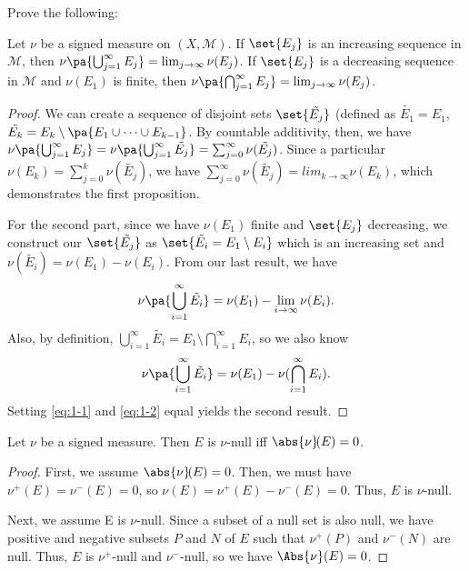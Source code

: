 \documentclass[12pt,letterpaper,twoside]{hmcpset}
\begin{document}
Prove the following:

\begin{problem}[1]
 Let $\nu$ be a signed measure on $(X,\mathcal{M})$. If $\set{E_j}$ is an increasing sequence in $\mathcal{M}$, then $\nu\pa{\bigcup^\infty_{j=1} E_j} = \lim_{j\to\infty} \nu(E_j)$.  If $\set{E_j}$ is a decreasing sequence in $\mathcal{M}$ and $\nu(E_1)$ is finite, then  $\nu\pa{\bigcap^\infty_{j=1} E_j} = \lim_{j\to\infty} \nu(E_j)$. 
\end{problem}

\begin{solution}
 \begin{proof}
  We can create a sequence of disjoint sets $\set{\tilde{E_j}}$ (defined as $\tilde{E_1} = E_1$, $\tilde{E_k} = E_k \setminus \pa{E_1 \cup \dotsb \cup E_{k-1}}$. By countable additivity, then, we have $\nu\pa{\bigcup^\infty_{j=1} E_j} = \nu\pa{\bigcup^\infty_{j=1} \tilde{E_j}} = \sum^\infty_{j=0} \nu(\tilde{E_j})$. Since a particular $\nu(E_k) = \sum^k_{j=0} \nu(\tilde{E_j})$, we have $\sum^\infty_{j=0} \nu(\tilde{E_j}) = lim_{k\to\infty} \nu(E_k)$, which demonstrates the first proposition.
  
  For the second part, since we have $\nu(E_1)$ finite and $\set{E_j}$ decreasing, we construct our $\set{\tilde{E_j}}$ as $\set{\tilde{E_i} = E_1 \setminus E_i}$ which is an increasing set and $\nu(\tilde{E_i}) = \nu(E_1) - \nu(E_i)$.  From our last result, we have 
  \begin{equation}
   \nu\pa{\bigcup^\infty_{i=1} \tilde{E_i}} = \nu(E_1) - \lim_{i\to\infty} \nu(E_i).
   \label{eq:1-1}
  \end{equation}
Also, by definition, $\bigcup^\infty_{i=1} \tilde{E_i} = E_1 \setminus \bigcap^\infty_{i=1} E_i$, so we also know 
\begin{equation}
 \nu\pa{\bigcup^\infty_{i=1} \tilde{E_i}} = \nu(E_1) - \nu(\bigcap^\infty_{i=1} E_i). 
 \label{eq:1-2}
\end{equation}
Setting \ref{eq:1-1} and \ref{eq:1-2} equal yields the second result.
 \end{proof}

\end{solution}


\begin{problem}[2]
 Let $\nu$ be a signed measure.  Then $E$ is $\nu$-null iff $\abs{\nu}\!(E) = 0$.
\end{problem}

\begin{solution}
 \begin{proof}
  First, we assume $\abs{\nu}\!(E) = 0$.  Then, we must have $\nu^+(E) = \nu^-(E) = 0$, so $\nu(E) = \nu^+(E) - \nu^-(E) = 0$.  Thus, $E$ is $\nu$-null.
  
  Next, we assume E is $\nu$-null. Since a subset of a null set is also null, we have positive and negative subsets $P$ and $N$ of $E$ such that $\nu^+(P)$ and $\nu^-(N)$ are null.  Thus, $E$ is $\nu^+$-null and $\nu^-$-null, so we have $\Abs{\nu}(E) = 0$.
 \end{proof}
\end{solution}
\end{document}
